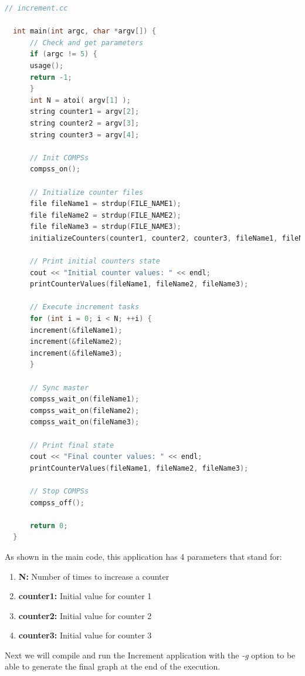 \begin{lstlisting}[language=c]
  // increment.cc
  
  int main(int argc, char *argv[]) {
      // Check and get parameters
      if (argc != 5) {
	  usage();
	  return -1;
      }
      int N = atoi( argv[1] );
      string counter1 = argv[2];
      string counter2 = argv[3];
      string counter3 = argv[4];

      // Init COMPSs
      compss_on();

      // Initialize counter files
      file fileName1 = strdup(FILE_NAME1);
      file fileName2 = strdup(FILE_NAME2);
      file fileName3 = strdup(FILE_NAME3);
      initializeCounters(counter1, counter2, counter3, fileName1, fileName2, fileName3);

      // Print initial counters state
      cout << "Initial counter values: " << endl;
      printCounterValues(fileName1, fileName2, fileName3);

      // Execute increment tasks
      for (int i = 0; i < N; ++i) {
	  increment(&fileName1);
	  increment(&fileName2);
	  increment(&fileName3);
      }

      // Sync master
      compss_wait_on(fileName1);
      compss_wait_on(fileName2);
      compss_wait_on(fileName3);

      // Print final state
      cout << "Final counter values: " << endl;
      printCounterValues(fileName1, fileName2, fileName3);

      // Stop COMPSs
      compss_off();

      return 0;
  }
\end{lstlisting}

As shown in the main code, this application has 4 parameters that stand for:

\begin{enumerate}
 \item \textbf{N:} Number of times to increase a counter
 \item \textbf{counter1:} Initial value for counter 1
 \item \textbf{counter2:} Initial value for counter 2
 \item \textbf{counter3:} Initial value for counter 3
\end{enumerate}

Next we will compile and run the Increment application with the \textit{-g} option to be able to generate the final graph at the end 
of the execution.

